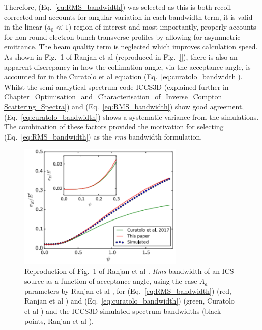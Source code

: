 \documentclass[../main.tex]{subfiles}
\begin{document}
Therefore, (Eq.~\ref{eq:RMS_bandwidth}) was selected as this is both recoil corrected and accounts for angular variation in each bandwidth term, it is valid in the linear ($a_{0}\ll 1$) region of interest and most importantly, properly accounts for non-round electron bunch transverse profiles by allowing for asymmetric emittance. The beam quality term is neglected which improves calculation speed. As shown in Fig.~1 of Ranjan et al \cite{ranjan2018simulation} (reproduced in Fig.~\ref{}), there is also an apparent discrepancy in how the collimation angle, via the acceptance angle, is accounted for in the Curatolo et al equation (Eq.~\ref{eq:curatolo_bandwidth}). Whilst the semi-analytical spectrum code \textsc{ICCS3D} \cite{krafft2016laser,ranjan2018simulation} (explained further in Chapter~\ref{Optimisation_and_Characterisation_of_Inverse_Compton Scattering_Spectra}) and (Eq.~\ref{eq:RMS_bandwidth}) show good agreement, (Eq.~\ref{eq:curatolo_bandwidth}) shows a systematic variance from the simulations. The combination of these factors provided the motivation for selecting (Eq.~\ref{eq:RMS_bandwidth}) as the \textit{rms} bandwidth formulation.
\begin{figure}[!h]
\centering
\includegraphics[width=0.7\textwidth]{Figures/Photon_Production_by_Inverse_Compton_Scattering/ranjan_curatolo_disagreement.pdf}
\caption{Reproduction of Fig.~1 of Ranjan et al \cite{ranjan2018simulation}. \textit{Rms} bandwidth of an ICS source as a function of acceptance angle, using the case $A_{a}$ parameters by Ranjan et al \cite{ranjan2018simulation}, for (Eq.~\ref{eq:RMS_bandwidth}) (red, Ranjan et al \cite{ranjan2018simulation}) and (Eq.~\ref{eq:curatolo_bandwidth}) (green, Curatolo et al \cite{curatolo2017analytical}) and the \textsc{ICCS3D} simulated spectrum bandwidths (black points, Ranjan et al \cite{ranjan2018simulation}). }
\label{fig:curatolo_ranjan_disagreement}
\end{figure}
\end{document}
